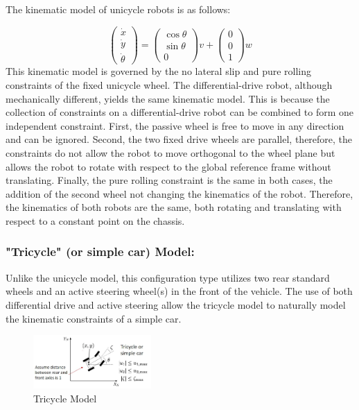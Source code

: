 \documentclass[twoside]{article}
\begin{document}
The kinematic model of unicycle robots is as follows:

\[ \begin{pmatrix}
\dot{x} \\ \dot{y} \\ \dot{\theta}
\end{pmatrix} =
\begin{pmatrix} \cos \theta \\ \sin \theta \\ 0 \end{pmatrix} v + \begin{pmatrix} 0 \\ 0 \\ 1 \end{pmatrix} w
\]
This kinematic model is governed by the no lateral slip and pure rolling constraints of the fixed unicycle wheel. The differential-drive robot, although mechanically different, yields the same kinematic model. This is because the collection of constraints on a differential-drive robot can be combined to form one independent constraint. First, the passive wheel is free to move in any direction and can be ignored. Second, the two fixed drive wheels are parallel, therefore, the constraints do not allow the robot to move orthogonal to the wheel plane but allows the robot to rotate with respect to the global reference frame without translating. Finally, the pure rolling constraint is the same in both cases, the addition of the second wheel not changing the kinematics of the robot. Therefore, the kinematics of both robots are the same, both rotating and translating with respect to a constant point on the chassis. 

\subsubsection*{"Tricycle" (or simple car) Model:}

Unlike the unicycle model, this configuration type utilizes two rear standard wheels and an active steering wheel(s) in the front of the vehicle. The use of both differential drive and active steering allow the tricycle model to naturally model the kinematic constraints of a simple car\cite{sns}.

\begin{figure}[H]
\centering
\includegraphics[width=0.4\textwidth]{tricycle}
\caption{Tricycle Model}
\end{figure}
\end{document}
